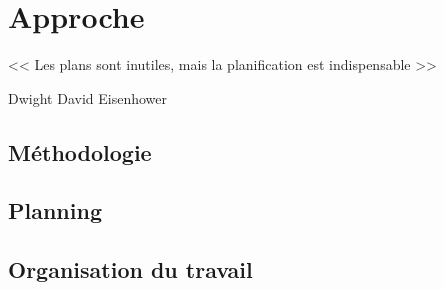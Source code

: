 \chapter{Approche}

\epigraph{<< Les plans sont inutiles, mais la planification est indispensable >>}{Dwight David Eisenhower}

\section{Méthodologie}
\section{Planning}
\section{Organisation du travail}
